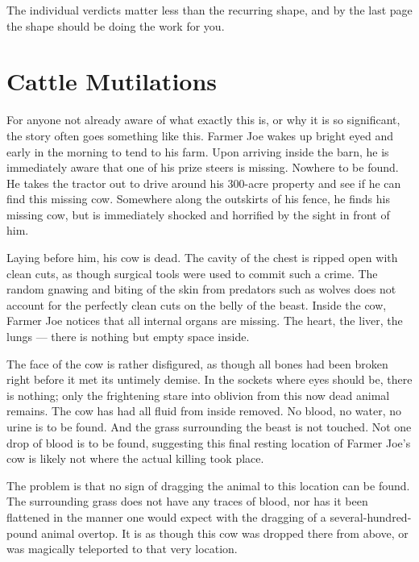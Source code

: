  The individual verdicts
matter less than the recurring shape, and by the last page the shape should be doing the work for
you.

\section{Cattle Mutilations}\label{sec:cattlemutilations}

For anyone not already aware of what exactly this is, or why it is so significant, the story often
goes something like this. Farmer Joe wakes up bright eyed and early in the morning to tend to his
farm. Upon arriving inside the barn, he is immediately aware that one of his prize steers is
missing. Nowhere to be found. He takes the tractor out to drive around his 300-acre property and
see if he can find this missing cow. Somewhere along the outskirts of his fence, he finds his
missing cow, but is immediately shocked and horrified by the sight in front of him.

Laying before him, his cow is dead. The cavity of the chest is ripped open with clean cuts, as
though surgical tools were used to commit such a crime. The random gnawing and biting of the skin
from predators such as wolves does not account for the perfectly clean cuts on the belly of the
beast. Inside the cow, Farmer Joe notices that all internal organs are missing. The heart, the
liver, the lungs --- there is nothing but empty space inside.

The face of the cow is rather disfigured, as though all bones had been broken right before it met
its untimely demise. In the sockets where eyes should be, there is nothing; only the frightening
stare into oblivion from this now dead animal remains. The cow has had all fluid from inside
removed. No blood, no water, no urine is to be found. And the grass surrounding the beast is not
touched. Not one drop of blood is to be found, suggesting this final resting location of Farmer
Joe's cow is likely not where the actual killing took place.

The problem is that no sign of dragging the animal to this location can be found. The surrounding
grass does not have any traces of blood, nor has it been flattened in the manner one would expect
with the dragging of a several-hundred-pound animal overtop. It is as though this cow was dropped
there from above, or was magically teleported to that very location.

